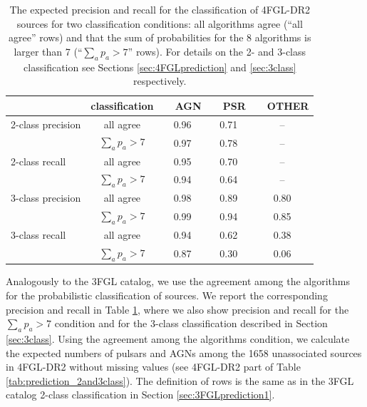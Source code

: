 \begin{table}[!h]
\centering
    \tiny
  
 \renewcommand{\tabcolsep}{0.3mm}
\renewcommand{\arraystretch}{1.5}

    \begin{tabular}{l c c c c}
    \hline
    \hline
    & classification &\ \  AGN &\ \   PSR &\ \   OTHER \\
    \hline
    2-class precision & all     agree            & 0.96 &  0.71 & --  \\ 
                                & $\sum_a p_a > 7$ & 0.97 &  0.78  & -- \\
    \hline
    2-class recall       & all     agree            & 0.95 &  0.70 & --  \\ 
                                & $\sum_a p_a > 7$ & 0.94 &  0.64  & -- \\
    \hline
    3-class precision & all     agree            & 0.98 & 0.89  & 0.80  \\ 
                                & $\sum_a p_a > 7$ & 0.99 &  0.94  & 0.85 \\
    \hline
    3-class recall       & all     agree            & 0.94 &  0.62 & 0.38  \\ 
                                & $\sum_a p_a > 7$ & 0.87 &  0.30  & 0.06 \\
    \hline
    \end{tabular}%
    \vspace{2mm}
    \caption{The expected precision and recall for the classification of 4FGL-DR2 sources
    for two classification conditions: all algorithms agree (``all agree'' rows) and that the sum of probabilities for the 8 algorithms 
    is larger than 7 (``$\sum_a p_a > 7$'' rows). For details on the 2- and 3-class classification see Sections \ref{sec:4FGLprediction} and 
    \ref{sec:3class} respectively. }
    \label{tab:prec_recall_4FGL}
\end{table}

Analogously to the 3FGL catalog, we use the agreement among the algorithms for the probabilistic classification of sources.
We report the corresponding precision and recall in Table \ref{tab:prec_recall_4FGL}, where we also show precision and recall
for the $\sum_a p_a > 7$ condition and for the 3-class classification described in Section \ref{sec:3class}.
Using the agreement among the algorithms condition,
we calculate the expected numbers of pulsars and AGNs among the 1658 unassociated sources in 4FGL-DR2 without missing values 
(see 4FGL-DR2 part of Table \ref{tab:prediction_2and3class}).
The definition of rows is the same as in the 3FGL catalog 2-class classification in Section \ref{sec:3FGLprediction1}.

